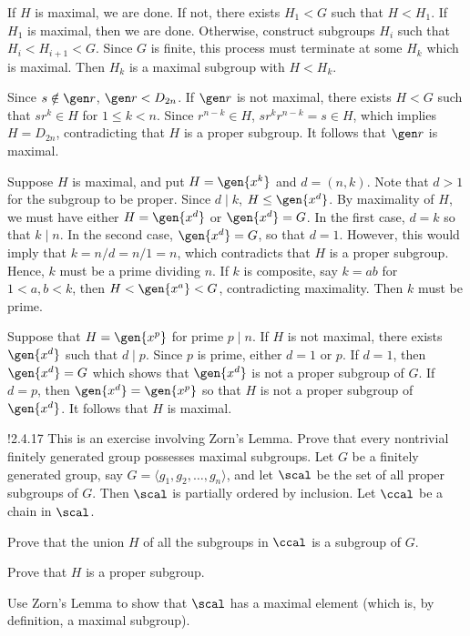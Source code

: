 \begin{solenum}
    \item If $H$ is maximal, we are done.
	If not, there exists $H_1 < G$ such that $H < H_1$.
	If $H_1$ is maximal, then we are done.
	Otherwise, construct subgroups $H_i$ such that $H_i < H_{i + 1} < G$.
	Since $G$ is finite, this process must terminate at some $H_k$ which is maximal.
	Then $H_k$ is a maximal subgroup with $H < H_k$.
    \item Since $s \notin \gen r$, $\gen r < D_{2n}$.
	If $\gen r$ is not maximal, there exists $H < G$ such that $sr^k \in H$ for $1 \leq k < n$.
	Since $r^{n - k} \in H$, $sr^kr^{n - k} = s \in H$, which implies $H = D_{2n}$, contradicting that $H$ is a proper subgroup.
	It follows that $\gen r$ is maximal.
    \item \rightimp Suppose $H$ is maximal, and put $H = \gen{x^k}$ and $d = (n, k)$.
	Note that $d > 1$ for the subgroup to be proper.
	Since $d \mid k$, $H \leq \gen{x^d}$.
	By maximality of $H$, we must have either $H = \gen{x^d}$ or $\gen{x^d} = G$.
	In the first case, $d = k$ so that $k \mid n$.
	In the second case, $\gen{x^d} = G$, so that $d = 1$.
	However, this would imply that $k = n/d = n/1 = n$, which contradicts that $H$ is a proper subgroup.
	Hence, $k$ must be a prime dividing $n$.
	If $k$ is composite, say $k = ab$ for $1 < a, b < k$, then $H < \gen{x^a} < G$, contradicting maximality.
	Then $k$ must be prime.

    \leftimp Suppose that $H = \gen{x^p}$ for prime $p \mid n$.
	If $H$ is not maximal, there exists $\gen{x^d}$ such that $d \mid p$.
	Since $p$ is prime, either $d = 1$ or $p$.
	If $d = 1$, then $\gen{x^d} = G$ which shows that $\gen{x^d}$ is not a proper subgroup of $G$.
	If $d = p$, then $\gen{x^d} = \gen{x^p}$ so that $H$ is not a proper subgroup of $\gen{x^d}$.
	It follows that $H$ is maximal.
\end{solenum}

\begin{exercise}!{2.4.17}
    This is an exercise involving Zorn's Lemma.
	Prove that every nontrivial finitely generated group possesses maximal subgroups.
	Let $G$ be a finitely generated group, say $G=\langle g_1, g_2, \ldots, g_n\rangle$, and let $\scal$ be the set of all proper subgroups of $G$.
	Then $\scal$ is partially ordered by inclusion.
	Let $\ccal$ be a chain in $\scal$.
    \begin{subexercises}
        \item Prove that the union $H$ of all the subgroups in $\ccal$ is a subgroup of $G$.
        \item Prove that $H$ is a proper subgroup.  
        \item Use Zorn's Lemma to show that $\scal$ has a maximal element (which is, by definition, a maximal subgroup).
    \end{subexercises}
\end{exercise}


